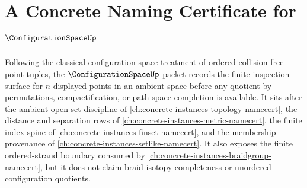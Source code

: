 \chapter{A Concrete Naming Certificate for $\ConfigurationSpaceUp$}
\label{ch:concrete-instances-configuration-space-namecert}

Following the classical configuration-space treatment of ordered collision-free point tuples, the $\ConfigurationSpaceUp$ packet records the finite inspection surface for $n$ displayed points in an ambient space before any quotient by permutations, compactification, or path-space completion is available. It sits after the ambient open-set discipline of \autoref{ch:concrete-instances-topology-namecert}, the distance and separation rows of \autoref{ch:concrete-instances-metric-namecert}, the finite index spine of \autoref{ch:concrete-instances-finset-namecert}, and the membership provenance of \autoref{ch:concrete-instances-setlike-namecert}. It also exposes the finite ordered-strand boundary consumed by \autoref{ch:concrete-instances-braidgroup-namecert}, but it does not claim braid isotopy completeness or unordered configuration quotients.

